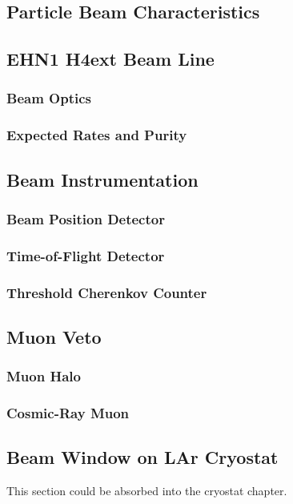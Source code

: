 
\subsection{Particle Beam Characteristics}

\subsection{EHN1 H4ext Beam Line}
\subsubsection{Beam Optics}
\subsubsection{Expected Rates and Purity}

\subsection{Beam Instrumentation}
\subsubsection{Beam Position Detector}
\subsubsection{Time-of-Flight Detector}
\subsubsection{Threshold Cherenkov Counter}

\subsection{Muon Veto}
\subsubsection{Muon Halo}
\subsubsection{Cosmic-Ray Muon}

\subsection{Beam Window on LAr Cryostat}
This section could be absorbed into the cryostat chapter.

